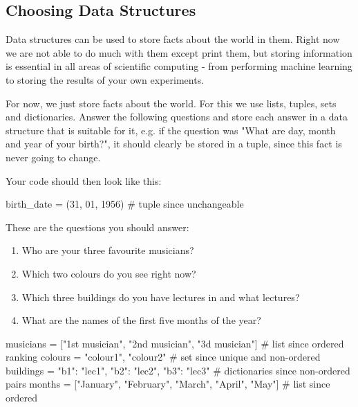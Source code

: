 \subsection{Choosing Data Structures}

Data structures can be used to store facts about the world in them. Right now we are not able to do much with them except print them, but storing information is essential in all areas of scientific computing - from performing machine learning to storing the results of your own experiments. 

\vspace{1em}

\noindent For now, we just store facts about the world. For this we use lists, tuples, sets and dictionaries. Answer the following questions and store each answer in a data structure that is suitable for it, e.g. if the question was "What are day, month and year of your birth?", it should clearly be stored in a tuple, since this fact is never going to change. 

\vspace{1em}

\noindent Your code should then look like this:
\begin{pythoncode}
birth_date = (31, 01, 1956) # tuple since unchangeable
\end{pythoncode}

These are the questions you should answer:

\begin{enumerate}
	\item Who are your three favourite musicians?	
	\item Which two colours do you see right now?
	\item Which three buildings do you have lectures in and what lectures?
	\item What are the names of the first five months of the year?
\end{enumerate}

\begin{solution}
	\begin{pythoncode}
musicians = ["1st musician", "2nd musician", "3d musician"] # list since ordered ranking
colours = {"colour1", "colour2"}                            # set since unique and non-ordered
buildings = {"b1": "lec1", "b2": "lec2", "b3": "lec3"}      # dictionaries since non-ordered pairs
months = ["January", "February", "March", "April", "May"]   # list since ordered
	\end{pythoncode}
\end{solution}


